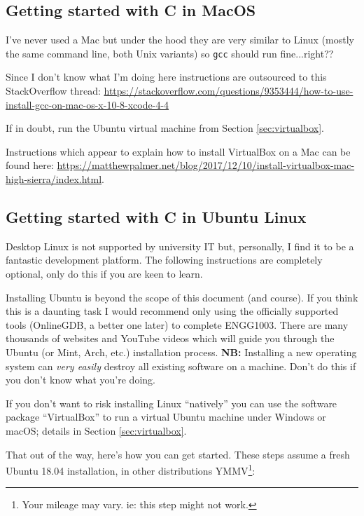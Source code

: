 \documentclass{lab}
\begin{document}
\subsection{Getting started with C in MacOS}

I've never used a Mac but under the hood they are very similar to Linux (mostly the same command line, both Unix variants) so \texttt{gcc} should run fine...right??

Since I don't know what I'm doing here instructions are outsourced to this StackOverflow thread: \url{https://stackoverflow.com/questions/9353444/how-to-use-install-gcc-on-mac-os-x-10-8-xcode-4-4}

If in doubt, run the Ubuntu virtual machine from Section \ref{sec:virtualbox}.

Instructions which appear to explain how to install VirtualBox on a Mac can be found here: \url{https://matthewpalmer.net/blog/2017/12/10/install-virtualbox-mac-high-sierra/index.html}.

\pagebreak
\subsection{Getting started with C in Ubuntu Linux}

Desktop Linux is not supported by university IT but, personally, I find it to be a fantastic development platform. The following instructions are completely optional, only do this if you are keen to learn.

Installing Ubuntu is beyond the scope of this document (and course). If you think this is a daunting task I would recommend only using the officially supported tools (OnlineGDB, a better one later) to complete ENGG1003. There are many thousands of websites and YouTube videos which will guide you through the Ubuntu (or Mint, Arch, etc.) installation process. \textbf{NB:} Installing a new operating system can \textit{very easily} destroy all existing software on a machine. Don't do this if you don't know what you're doing.

If you don't want to risk installing Linux ``natively'' you can use the software package ``VirtualBox'' to run a virtual Ubuntu machine under Windows or macOS; details in Section \ref{sec:virtualbox}.

That out of the way, here's how you can get started. These steps assume a fresh Ubuntu 18.04 installation, in other distributions YMMV\footnote{Your mileage may vary. ie: this step might not work.}:
\end{document}
